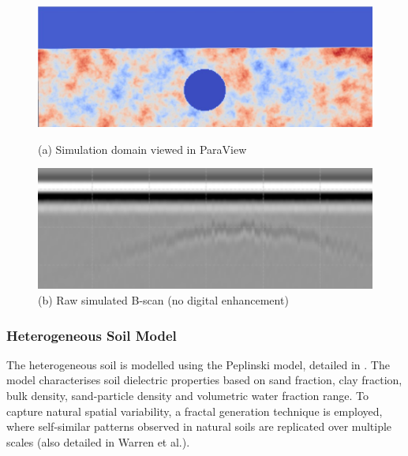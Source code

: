             \begin{figure}[htbp]
            \centering
            \begin{minipage}[b]{0.48\textwidth}
                \centering
                \includegraphics[width=\textwidth]{figs/Rory/radar_domain.pdf}
                \caption{(a) Simulation domain viewed in ParaView }
                \label{fig:radar_domain}
            \end{minipage}
            \hfill
            \begin{minipage}[b]{0.48\textwidth}
                \centering
                \includegraphics[width=\textwidth]{figs/Rory/sim_bscan_cropped.png}
                \caption{(b) Raw simulated B-scan (no digital enhancement)}
                \label{fig:original_bscan}
            \end{minipage}
        \end{figure}
        \noindent 
    
    \subsubsection{Heterogeneous Soil Model}
    
        \noindent The heterogeneous soil is modelled using the Peplinski model, detailed in \cite{warren2016gprmax}. The model characterises soil dielectric properties based on sand fraction, clay fraction, bulk density, sand-particle density and volumetric water fraction range. To capture natural spatial variability, a fractal generation technique is employed, where self-similar patterns observed in natural soils are replicated over multiple scales (also detailed in Warren et al.).

